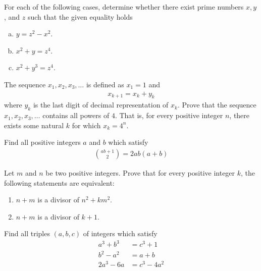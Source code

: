 \documentclass[problems.tex]{subfile}
\begin{document}
	\begin{problem}
		For each of the following cases, determine whether there exist prime numbers $x,y$, and $z$ such that the given equality holds
		\begin{enumerate}[(a)]
			\item $y=z^2-x^2$.
			\item $x^2+y=z^4$.
			\item $x^2 +y^3 = z^4$.
		\end{enumerate}
	\end{problem}

	\begin{problem}
		The sequence $x_1, x_2, x_3, \dots$ is defined as $x_1 = 1$ and
		\begin{align*}
			x_{k+1} = x_k + y_k
		\end{align*}
		where $y_k$ is the last digit of decimal representation of $x_k$. Prove that the sequence $x_1, x_2, x_3, \dots$ contains all powers of $4$. That is, for every positive integer $n$, there exists some natural $k$ for which $x_k=4^n$.
	\end{problem}

	\begin{problem}
		Find all positive integers $a$ and $b$ which satisfy
		\begin{align*}
			\binom{ab+1}{2} = 2ab(a+b)
		\end{align*}
	\end{problem}

	\begin{problem}
		Let $m$ and $n$ be two positive integers. Prove that for every positive integer $k$, the following statements are equivalent:
		\begin{enumerate}
			\item $n+m$ is a divisor of $n^2+km^2$.
			\item $n+m$ is a divisor of $k+1$.
		\end{enumerate}
	\end{problem}

	\begin{problem}
		Find all triples $(a, b, c)$ of integers which satisfy
		\begin{align*}
			a^3 + b^3 &= c^3 + 1\\
			b^2 - a^2 &= a + b\\
			2a^3-6a   &= c^3 - 4a^2
		\end{align*}
	\end{problem}
\end{document}
